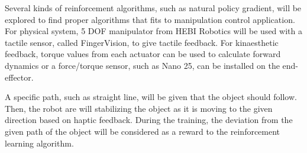 \documentclass{article}
\begin{document}
Several kinds of reinforcement algorithms, such as natural policy gradient, will be explored to find proper algorithms that fits to manipulation control application. For physical system, 5 DOF manipulator from HEBI Robotics will be used with a tactile sensor, called FingerVision, to give tactile feedback. For kinaesthetic feedback, torque values from each actuator can be used to calculate forward dynamics or a force/torque sensor, such as Nano 25, can be installed on the end-effector.

A specific path, such as straight line, will be given that the object should follow. Then, the robot are will stabilizing the object as it is moving to the given direction based on haptic feedback. During the training, the deviation from the given path of the object will be considered as a reward to the reinforcement learning algorithm. 





%
%
\end{document}
